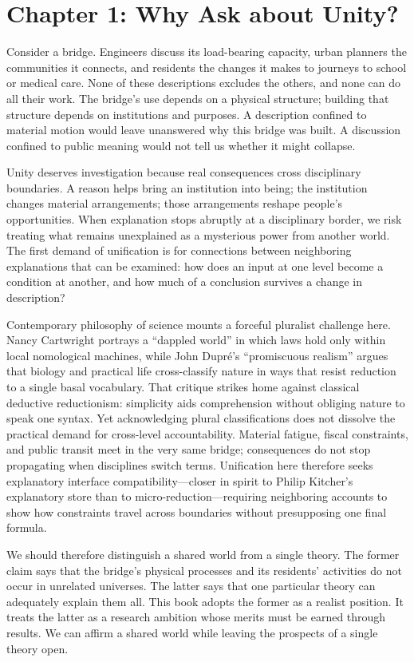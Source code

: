 \documentclass[
  english,
  11pt,
  oneside]{book}
\newcounter{none} %
\begin{document}
\chapter{Chapter 1: Why Ask about Unity?}\label{ph-ch-01}

Consider a bridge. Engineers discuss its load-bearing capacity, urban planners the communities it connects, and residents the changes it makes to journeys to school or medical care. None of these descriptions excludes the others, and none can do all their work. The bridge's use depends on a physical structure; building that structure depends on institutions and purposes. A description confined to material motion would leave unanswered why this bridge was built. A discussion confined to public meaning would not tell us whether it might collapse.

Unity deserves investigation because real consequences cross disciplinary boundaries. A reason helps bring an institution into being; the institution changes material arrangements; those arrangements reshape people's opportunities. When explanation stops abruptly at a disciplinary border, we risk treating what remains unexplained as a mysterious power from another world. The first demand of unification is for connections between neighboring explanations that can be examined: how does an input at one level become a condition at another, and how much of a conclusion survives a change in description?

Contemporary philosophy of science mounts a forceful pluralist challenge here. Nancy Cartwright portrays a ``dappled world'' in which laws hold only within local nomological machines, while John Dupré's ``promiscuous realism'' argues that biology and practical life cross-classify nature in ways that resist reduction to a single basal vocabulary. That critique strikes home against classical deductive reductionism: simplicity aids comprehension without obliging nature to speak one syntax. Yet acknowledging plural classifications does not dissolve the practical demand for cross-level accountability. Material fatigue, fiscal constraints, and public transit meet in the very same bridge; consequences do not stop propagating when disciplines switch terms. Unification here therefore seeks explanatory interface compatibility---closer in spirit to Philip Kitcher's explanatory store than to micro-reduction---requiring neighboring accounts to show how constraints travel across boundaries without presupposing one final formula.

We should therefore distinguish a shared world from a single theory. The former claim says that the bridge's physical processes and its residents' activities do not occur in unrelated universes. The latter says that one particular theory can adequately explain them all. This book adopts the former as a realist position. It treats the latter as a research ambition whose merits must be earned through results. We can affirm a shared world while leaving the prospects of a single theory open.
\end{document}
